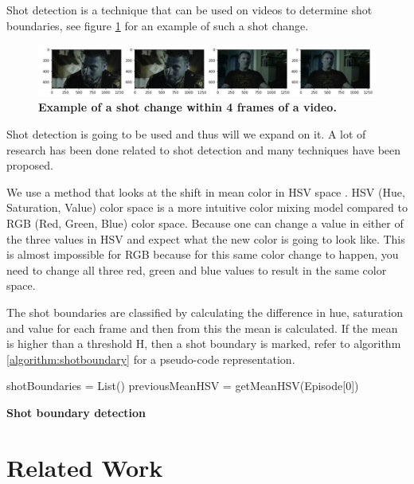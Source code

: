 \documentclass{article}
\begin{document}
Shot detection is a technique that can be used on videos to determine shot boundaries, see figure \ref{shotchange} for an example of such a shot change. 

\begin{figure}[H]
	\includegraphics[width=12cm]{images/shotchange.jpg}
	\centering
	\caption{\textbf{Example of a shot change within 4 frames of a video.}}
	\label{shotchange}
\end{figure}

Shot detection is going to be used and thus will we expand on it. A lot of research has been done related to shot detection \cite{lienhart1998comparison} and many techniques have been proposed. 

We use a method that looks at the shift in mean color in HSV space \cite{shao2015shot}. HSV (Hue, Saturation, Value) color space is a more intuitive color mixing model compared to RGB (Red, Green, Blue) color space. Because one can change a value in either of the three values in HSV and expect what the new color is going to look like. This is almost impossible for RGB because for this same color change to happen, you need to change all three red, green and blue values to result in the same color space.

The shot boundaries are classified by calculating the difference in hue, saturation and value for each frame and then from this the mean is calculated. If the mean is higher than a threshold H, then a shot boundary is marked, refer to algorithm \ref{algorithm:shotboundary} for a pseudo-code representation.

\begin{algorithm}[H] 
	\SetAlgoLined
	shotBoundaries = List()\;
	previousMeanHSV = getMeanHSV(Episode[0])\;
	\caption{\textbf{Shot boundary detection}}
	\label{algorithm:shotboundary}
\end{algorithm}

\section{Related Work} \label{relatedwork}
\end{document}
